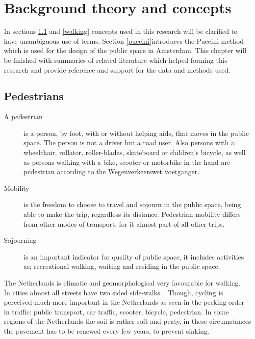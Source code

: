 \chapter[Background theory and concepts]{Background theory and concepts}
In sections \ref{pedestrians} and \ref{walking} concepts used in this research will be clarified to have unambiguous use of terms. Section \ref{puccini}introduces the Puccini method which is used for the design of the public space in Amsterdam. 
This chapter will be finished with summaries of related literature which helped forming this research and provide reference and support for the data and methods used.

\section[Pedestrians]{Pedestrians}\label{pedestrians}
\begin{description}\item[A pedestrian] is a person, by foot, with or without helping aids, that moves in the public space. The person is not a driver but a road user. Also persons with a wheelchair, rollator, roller-blades, skateboard or children's bicycle, as well as persons walking with a bike, scooter or motorbike in the hand are pedestrian according to the Wegenverkeerswet voetganger.~\cite{Crow2014}
\item[Mobility] is the freedom to choose to travel and sojourn in the public space, being able to make the trip, regardless its distance. Pedestrian mobility differs from other modes of transport, for it almost part of all other trips.~\cite{Sauter2010}
\item[Sojourning] is an important indicator for quality of public space, it includes activities as; recreational walking, waiting and residing in the public space.~\cite{Sauter2010} \end{description}

The Netherlands is climatic and geomorphological very favourable for walking.~\cite{Sauter2010} In cities almost all streets have two sided side-walks.~\cite{Sauter2010} Though, cycling is perceived much more important in the Netherlands as seen in the pecking order in traffic: public transport, car traffic, scooter, bicycle, pedestrian. In some regions of the Netherlands the soil is rather soft and peaty, in these circumstances the pavement has to be renewed every few years, to prevent sinking.
	
